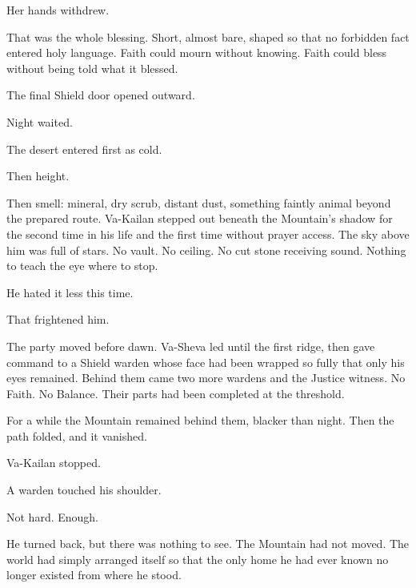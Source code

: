Her hands withdrew.\par

That was the whole blessing. Short, almost bare, shaped so that no forbidden fact entered holy language. Faith could mourn without knowing. Faith could bless without being told what it blessed.\par

The final Shield door opened outward.\par

Night waited.\par

The desert entered first as cold.\par

Then height.\par

Then smell: mineral, dry scrub, distant dust, something faintly animal beyond the prepared route. Va-Kailan stepped out beneath the Mountain’s shadow for the second time in his life and the first time without prayer access. The sky above him was full of stars. No vault. No ceiling. No cut stone receiving sound. Nothing to teach the eye where to stop.\par

He hated it less this time.\par

That frightened him.\par

The party moved before dawn. Va-Sheva led until the first ridge, then gave command to a Shield warden whose face had been wrapped so fully that only his eyes remained. Behind them came two more wardens and the Justice witness. No Faith. No Balance. Their parts had been completed at the threshold.\par

For a while the Mountain remained behind them, blacker than night. Then the path folded, and it vanished.\par

Va-Kailan stopped.\par

A warden touched his shoulder.\par

Not hard. Enough.\par

He turned back, but there was nothing to see. The Mountain had not moved. The world had simply arranged itself so that the only home he had ever known no longer existed from where he stood.\par

